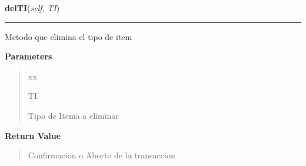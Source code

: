 \hspace{.8\funcindent}\begin{boxedminipage}{\funcwidth}

    \raggedright \textbf{delTI}(\textit{self}, \textit{TI})

    \vspace{-1.5ex}

    \rule{\textwidth}{0.5\fboxrule}
\setlength{\parskip}{2ex}
    Metodo que elimina el tipo de item

\setlength{\parskip}{1ex}
      \textbf{Parameters}
      \vspace{-1ex}

      \begin{quote}
        \begin{Ventry}{xx}

          \item[TI]

          Tipo de Itema a eliminar

        \end{Ventry}

      \end{quote}

      \textbf{Return Value}
    \vspace{-1ex}

      \begin{quote}
      Confirmacion o Aborto de la transaccion

      \end{quote}

    \end{boxedminipage}

    \label{app:controlador:contItem:ControllerTI:modTI}

    \vspace{0.5ex}


